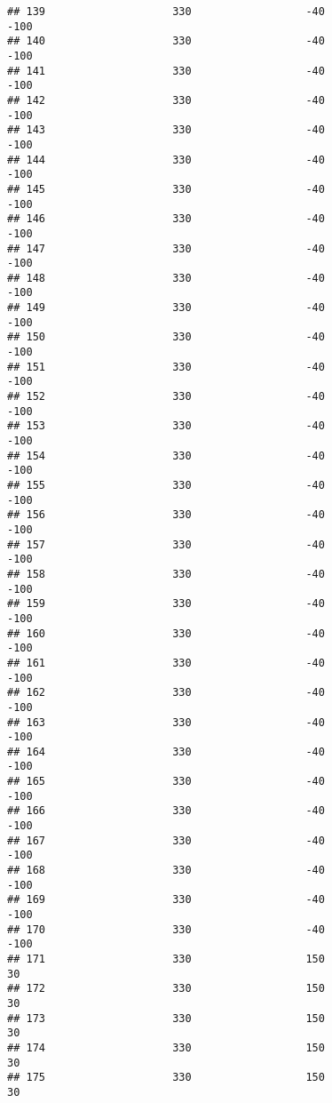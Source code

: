 \documentclass[]{article}
\begin{document}
\begin{verbatim}
## 139                    330                  -40                 -100
## 140                    330                  -40                 -100
## 141                    330                  -40                 -100
## 142                    330                  -40                 -100
## 143                    330                  -40                 -100
## 144                    330                  -40                 -100
## 145                    330                  -40                 -100
## 146                    330                  -40                 -100
## 147                    330                  -40                 -100
## 148                    330                  -40                 -100
## 149                    330                  -40                 -100
## 150                    330                  -40                 -100
## 151                    330                  -40                 -100
## 152                    330                  -40                 -100
## 153                    330                  -40                 -100
## 154                    330                  -40                 -100
## 155                    330                  -40                 -100
## 156                    330                  -40                 -100
## 157                    330                  -40                 -100
## 158                    330                  -40                 -100
## 159                    330                  -40                 -100
## 160                    330                  -40                 -100
## 161                    330                  -40                 -100
## 162                    330                  -40                 -100
## 163                    330                  -40                 -100
## 164                    330                  -40                 -100
## 165                    330                  -40                 -100
## 166                    330                  -40                 -100
## 167                    330                  -40                 -100
## 168                    330                  -40                 -100
## 169                    330                  -40                 -100
## 170                    330                  -40                 -100
## 171                    330                  150                   30
## 172                    330                  150                   30
## 173                    330                  150                   30
## 174                    330                  150                   30
## 175                    330                  150                   30

\end{verbatim}
\end{document}
